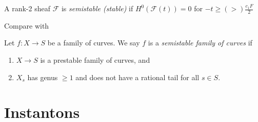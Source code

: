 \documentclass{book}
\begin{document}
\begin{definition}
\label{definition-slope-stability}
A rank-2 sheaf $\mathcal{F}$ is
{\it semistable (stable)} if
$H^{0}(\mathcal{F}(t))=0$ for $-t \geq(>)
\frac{c_1F}{2}$
\end{definition}

\noindent
Compare with

\begin{definition}
\label{definition-semistable}
Let $f : X \to S$ be a family of curves.
We say $f$ is a {\it semistable
family of curves} if
\begin{enumerate}
\item $X \to S$ is a prestable family of
curves,
and
\item $X_s$ has genus $\geq 1$ and
does not have a rational tail for all $s \in
S$.
\end{enumerate}
\end{definition}

\section{Instantons}
\label{section-instantons}
\end{document}
